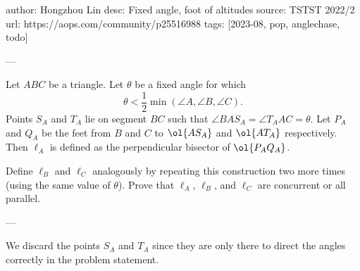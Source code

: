 author: Hongzhou Lin
desc: Fixed angle, foot of altitudes
source: TSTST 2022/2
url: https://aops.com/community/p25516988
tags: [2023-08, pop, anglechase, todo]

---

Let $ABC$ be a triangle.
Let $\theta$ be a fixed angle for which
\[ \theta < \frac12 \min(\angle A, \angle B, \angle C). \]
Points $S_A$ and $T_A$ lie on segment $BC$
such that $\angle BAS_A = \angle T_AAC = \theta$.
Let $P_A$ and $Q_A$ be the feet from $B$ and $C$
to $\ol{AS_A}$ and $\ol{AT_A}$ respectively.
Then $\ell_A$ is defined as the perpendicular bisector of $\ol{P_A Q_A}$.

Define $\ell_B$ and $\ell_C$ analogously by repeating this construction
two more times (using the same value of $\theta$).
Prove that $\ell_A$, $\ell_B$, and $\ell_C$ are concurrent or all parallel.

---

We discard the points $S_A$ and $T_A$ since they are only there
to direct the angles correctly in the problem statement.

